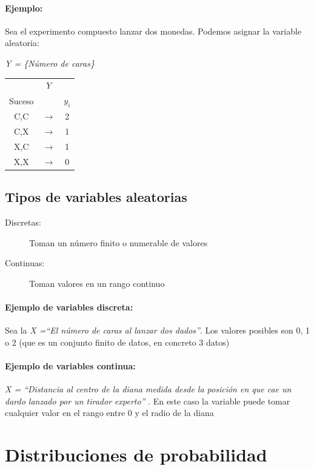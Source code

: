 \paragraph{Ejemplo:} Sea el experimento compuesto lanzar dos monedas. Podemos asignar la variable aleatoria: 
\begin{center}
\emph{Y = \{Número de caras\}} \\
\begin{tabular}{ccc}
 & $Y$ &  \\
Suceso &  &  $y_i$\\ \hline 
C,C & $\rightarrow$ & 2 \\ 
C,X & $\rightarrow$ & 1 \\ 
X,C & $\rightarrow$ & 1 \\ 
X,X & $\rightarrow$ & 0 \\ 
\end{tabular} 
\end{center}

\subsection{Tipos de variables aleatorias}
\begin{description}
\item[Discretas:] Toman un número finito o numerable de valores
\item[Continuas:] Toman valores en un rango continuo
\end{description}

\paragraph{Ejemplo de variables discreta:} Sea la \emph{X =“El número de caras al lanzar dos dados”}. Los valores posibles son 0, 1 o 2 (que es un conjunto finito de datos, en concreto 3 datos) 

\paragraph{Ejemplo de variables continua:} \emph{X = “Distancia al centro de la diana medida desde la posición en que cae un dardo lanzado por un tirador experto” }. En este caso la variable puede tomar cualquier valor en el rango entre 0 y el radio de la diana 

\section{Distribuciones de probabilidad}

